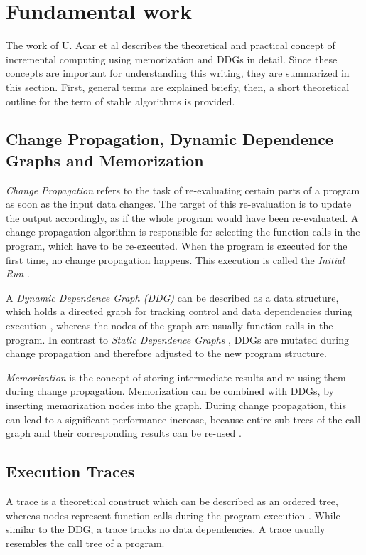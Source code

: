 \section{Fundamental work}
\label{sec:ddg_memo}
The work of U. Acar et al\cite{Acar2005thesis} describes the theoretical and practical concept of incremental computing using memorization and DDGs in detail. Since these concepts are important for understanding this writing, they are summarized in this section. First, general terms are explained briefly, then, a short theoretical outline for the term of stable algorithms is provided. 

\subsection{Change Propagation, Dynamic Dependence Graphs and Memorization}
\textit{Change Propagation} refers to the task of re-evaluating certain parts of a program as soon as the input data changes. The target of this re-evaluation is to update the output accordingly, as if the whole program would have been re-evaluated. A change propagation algorithm is responsible for selecting the function calls in the program, which have to be re-executed. When the program is executed for the first time, no change propagation happens. This execution is called the \textit{Initial Run} \cite{Acar2005thesis}.

A \textit{Dynamic Dependence Graph (DDG)} can be described as a data structure, which holds a directed graph for tracking control and data dependencies during execution \cite{Acar2005thesis}, whereas the nodes of the graph are usually function calls in the program. In contrast to \textit{Static Dependence Graphs} \cite{Demers1981}, DDGs are mutated during change propagation and therefore adjusted to the new program structure. 

\textit{Memorization} is the concept of storing intermediate results and re-using them during change propagation. Memorization can be combined with DDGs, by inserting memorization nodes into the graph. During change propagation, this can lead to a significant performance increase, because entire sub-trees of the call graph and their corresponding results can be re-used \cite{Acar2005thesis}. 

\subsection{Execution Traces}
A trace is a theoretical construct which can be described as an ordered tree, whereas nodes represent function calls during the program execution \cite{Acar2005thesis}. While similar to the DDG, a trace tracks no data dependencies. A trace usually resembles the call tree of a program. 

